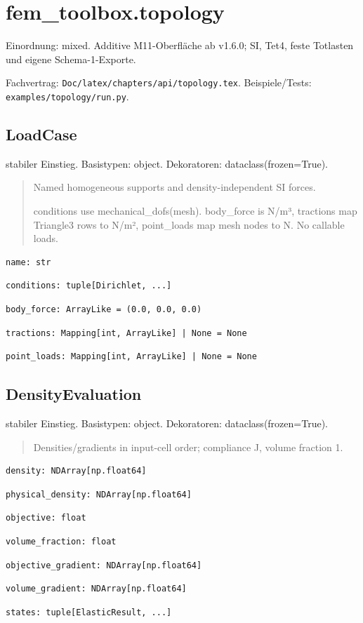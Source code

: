 \section{fem\_toolbox.topology}
Einordnung: mixed. Additive M11-Oberfläche ab v1.6.0; SI, Tet4, feste Totlasten und eigene Schema-1-Exporte.
\par Fachvertrag: \nolinkurl{Doc/latex/chapters/api/topology.tex}. Beispiele/Tests:
\nolinkurl{examples/topology/run.py}.
\subsection{LoadCase}
stabiler Einstieg.
Basistypen: object. Dekoratoren: dataclass(frozen=True).
\begin{quote}
Named homogeneous supports and density-independent SI forces.\par conditions use mechanical\_dofs(mesh). body\_force is N/m³, tractions map Triangle3 rows to N/m², point\_loads map mesh nodes to N. No callable loads.
\end{quote}
\begin{lstlisting}
name: str
\end{lstlisting}
\begin{lstlisting}
conditions: tuple[Dirichlet, ...]
\end{lstlisting}
\begin{lstlisting}
body_force: ArrayLike = (0.0, 0.0, 0.0)
\end{lstlisting}
\begin{lstlisting}
tractions: Mapping[int, ArrayLike] | None = None
\end{lstlisting}
\begin{lstlisting}
point_loads: Mapping[int, ArrayLike] | None = None
\end{lstlisting}
\subsection{DensityEvaluation}
stabiler Einstieg.
Basistypen: object. Dekoratoren: dataclass(frozen=True).
\begin{quote}
Densities/gradients in input-cell order; compliance J, volume fraction 1.
\end{quote}
\begin{lstlisting}
density: NDArray[np.float64]
\end{lstlisting}
\begin{lstlisting}
physical_density: NDArray[np.float64]
\end{lstlisting}
\begin{lstlisting}
objective: float
\end{lstlisting}
\begin{lstlisting}
volume_fraction: float
\end{lstlisting}
\begin{lstlisting}
objective_gradient: NDArray[np.float64]
\end{lstlisting}
\begin{lstlisting}
volume_gradient: NDArray[np.float64]
\end{lstlisting}
\begin{lstlisting}
states: tuple[ElasticResult, ...]
\end{lstlisting}
